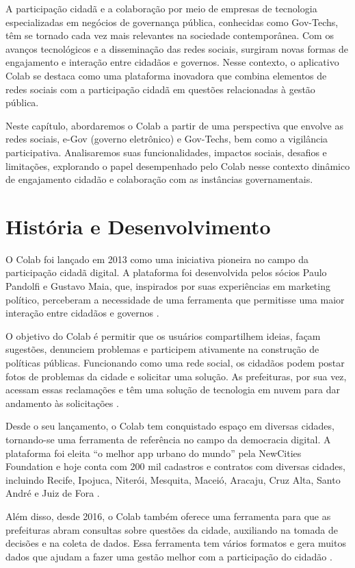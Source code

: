 A participação cidadã e a colaboração por meio de empresas de tecnologia especializadas em negócios de governança pública, conhecidas como Gov-Techs,  têm se tornado cada vez mais relevantes na sociedade contemporânea. Com os avanços tecnológicos e a disseminação das redes sociais, surgiram novas formas de engajamento e interação entre cidadãos e governos. Nesse contexto, o aplicativo Colab se destaca como uma plataforma inovadora que combina elementos de redes sociais com a participação cidadã em questões relacionadas à gestão pública.

Neste capítulo, abordaremos o Colab a partir de uma perspectiva que envolve as redes sociais, e-Gov (governo eletrônico) e Gov-Techs, bem como a vigilância participativa. Analisaremos suas funcionalidades, impactos sociais, desafios e limitações, explorando o papel desempenhado pelo Colab nesse contexto dinâmico de engajamento cidadão e colaboração com as instâncias governamentais.

\section*{História e Desenvolvimento}
O Colab foi lançado em 2013 como uma iniciativa pioneira no campo da participação cidadã digital. A plataforma foi desenvolvida pelos sócios Paulo Pandolfi e Gustavo Maia, que, inspirados por suas experiências em marketing político, perceberam a necessidade de uma ferramenta que permitisse uma maior interação entre cidadãos e governos \cite{2023_Colab_PAGE}.

O objetivo do Colab é permitir que os usuários compartilhem ideias, façam sugestões, denunciem problemas e participem ativamente na construção de políticas públicas. Funcionando como uma rede social, os cidadãos podem postar fotos de problemas da cidade e solicitar uma solução. As prefeituras, por sua vez, acessam essas reclamações e têm uma solução de tecnologia em nuvem para dar andamento às solicitações \cite{2023_Colab_PAGE}.

Desde o seu lançamento, o Colab tem conquistado espaço em diversas cidades, tornando-se uma ferramenta de referência no campo da democracia digital. A plataforma foi eleita “o melhor app urbano do mundo” pela NewCities Foundation e hoje conta com 200 mil cadastros e contratos com diversas cidades, incluindo Recife, Ipojuca, Niterói, Mesquita, Maceió, Aracaju, Cruz Alta, Santo André e Juiz de Fora \cite{2023_Colab_PAGE}.

Além disso, desde 2016, o Colab também oferece uma ferramenta para que as prefeituras abram consultas sobre questões da cidade, auxiliando na tomada de decisões e na coleta de dados. Essa ferramenta tem vários formatos e gera muitos dados que ajudam a fazer uma gestão melhor com a participação do cidadão \cite{2023_Colab_PAGE}.

